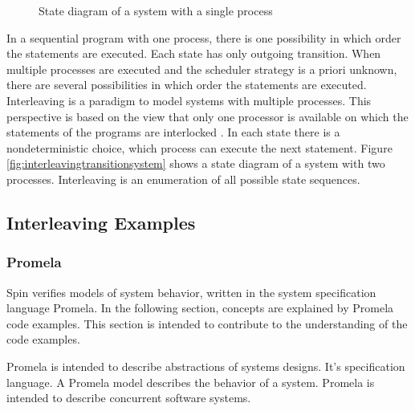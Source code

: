 \documentclass[a4paper, twoside]{article}
\begin{document}
\begin{figure}
 \centering

  \caption{State diagram of a system with a single process}
  \label{fig:sequencielstatediagram}
\end{figure}

In a sequential program with one process, there is one possibility in which order the statements are executed. Each state has only outgoing transition. When multiple processes are executed and the scheduler strategy is a priori unknown, there are several possibilities in which order the statements are executed. Interleaving is a paradigm to model systems with multiple processes. This perspective is based on the view that only one processor is available on which the statements of the programs are interlocked \cite{baier08}. In each state there is a nondeterministic choice, which process can execute the next statement. Figure \ref{fig:interleavingtransitionsystem} shows a state diagram of a system with two processes. Interleaving is an enumeration of all possible state sequences.

\subsection{Interleaving Examples}
\label{sec:interleavingexamples}

\subsubsection{Promela}
\label{sec:promela}

Spin verifies models of system behavior, written in the system specification language Promela. In the following section, concepts are explained by Promela code examples. This section is intended to contribute to the understanding of the code examples.

Promela is intended to describe abstractions of systems designs. It's specification language. A Promela model describes the behavior of a system. Promela is intended to describe concurrent software systems.
\end{document}
